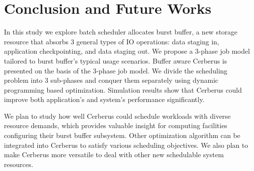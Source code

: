 \section{Conclusion and Future Works}
\label{Sec:Conclusion}

In this study we explore batch scheduler allocates burst buffer,
a new storage resource that absorbs 3 general types of IO operations:
data staging in, application checkpointing, and data staging out.
We propose a 3-phase job model tailored to burst buffer's typical usage scenarios.
Buffer aware Cerberus is presented on the basis of the 3-phase job model.
We divide the scheduling problem into 3 sub-phases
and conquer them separately using dynamic programming based optimization.
Simulation results show that
Cerberus could improve both application's and system's performance significantly.


We plan to study how well Cerberus could schedule workloads with diverse resource demands,
which provides valuable insight for computing facilities
configuring their burst buffer subsystem.
Other optimization algorithm can be integrated into Cerberus
to satisfy various scheduling objectives.
We also plan to make Cerberus more versatile
to deal with other new schedulable system resources.

